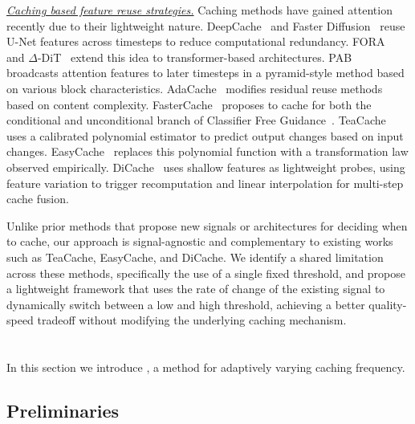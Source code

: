 \documentclass{article}
\begin{document}
\noindent\underline{\emph{Caching based feature reuse strategies.}}
Caching methods have gained attention recently due to their lightweight nature. DeepCache~\cite{xu2018deepcache} and Faster Diffusion~\cite{li2023fasterdiffusion} reuse U-Net features across timesteps to reduce computational redundancy. FORA~\cite{selvaraju2024fora} and $\Delta$-DiT~\cite{chen2024deltadit} extend this idea to transformer-based architectures. PAB~\cite{zhao2024pab} broadcasts attention features to later timesteps in a pyramid-style method based on various block characteristics. AdaCache~\cite{kahatapitiya2024adacache} modifies residual reuse methods based on content complexity. FasterCache~\cite{lv2024fastercache} proposes to cache for both the conditional and unconditional branch of Classifier Free Guidance~\cite{ho2022cfg}. TeaCache~\cite{liu2025teacache} uses a calibrated polynomial estimator to predict output changes based on input changes. EasyCache~\cite{zhou2025easycache} replaces this polynomial function with a transformation law observed empirically. DiCache~\cite{bu2025dicache} uses shallow features as lightweight probes, using feature variation to trigger recomputation and linear interpolation for multi-step cache fusion.

Unlike prior methods that propose new signals or architectures for deciding when to cache, our approach is signal-agnostic and complementary to existing works such as TeaCache, EasyCache, and DiCache. We identify a shared limitation across these methods, specifically the use of a single fixed threshold, and propose a lightweight framework that uses the rate of change of the existing signal to dynamically switch between a low and high threshold, achieving a better quality-speed tradeoff without modifying the underlying caching mechanism.

\section{\system}
In this section we introduce \system, a method for adaptively varying caching frequency.
\subsection{Preliminaries}
\end{document}

